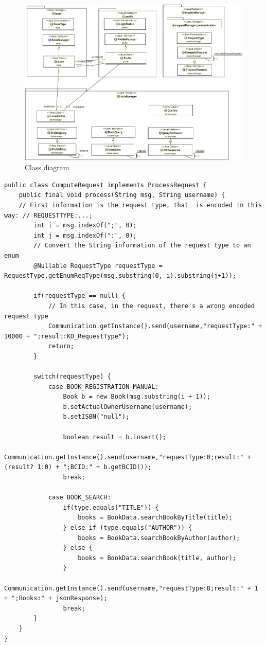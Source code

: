 \begin{figure}[h!]
	\includegraphics[width=\textwidth]{Immagini/iterazione_1_uml}
	\caption{Class diagram}
	\label{fig:ClassDiagramFirstIteration}
\end{figure}

\begin{lstlisting}
public class ComputeRequest implements ProcessRequest { 
	public final void process(String msg, String username) {
	// First information is the request type, that  is encoded in this way: // REQUESTTYPE:...;
		int i = msg.indexOf(";", 0);
		int j = msg.indexOf(":", 0);
		// Convert the String information of the request type to an enum
		@Nullable RequestType requestType = RequestType.getEnumReqType(msg.substring(0, i).substring(j+1));

		if(requestType == null) {
			// In this case, in the request, there's a wrong encoded request type
			Communication.getInstance().send(username,"requestType:" + 10000 + ";result:KO_RequestType");
			return;
		}

		switch(requestType) {
			case BOOK_REGISTRATION_MANUAL:
				Book b = new Book(msg.substring(i + 1));
				b.setActualOwnerUsername(username);
				b.setISBN("null");

				boolean result = b.insert();
				Communication.getInstance().send(username,"requestType:0;result:" + (result? 1:0) + ";BCID:" + b.getBCID());
				break;
				
			case BOOK_SEARCH:
				if(type.equals("TITLE")) {
					books = BookData.searchBookByTitle(title);
				} else if (type.equals("AUTHOR")) {
					books = BookData.searchBookByAuthor(author);
				} else {
					books = BookData.searchBook(title, author);
				}
				Communication.getInstance().send(username,"requestType:8;result:" + 1 + ";Books:" + jsonResponse);
				break;
		}
	}
}
\end{lstlisting}

